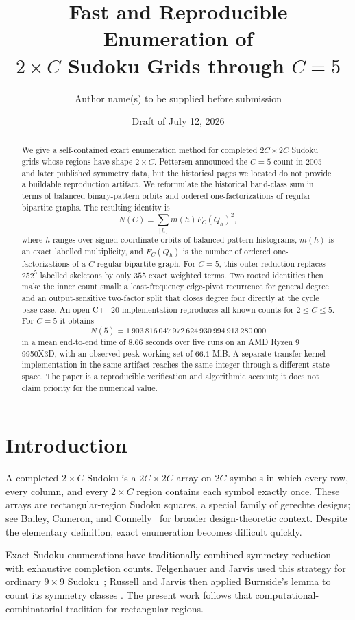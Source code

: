 \documentclass[11pt]{article}
\title{Fast and Reproducible Enumeration of\\
       \texorpdfstring{$2\times C$}{2 by C} Sudoku Grids through
       \texorpdfstring{$C=5$}{C=5}}
\author{Author name(s) to be supplied before submission}
\date{Draft of July 12, 2026}
\theoremstyle{definition}
\theoremstyle{remark}
\newcommand{\Nfive}{1\,903\,816\,047\,972\,624\,930\,994\,913\,280\,000}
\begin{document}
\maketitle

\begin{abstract}
We give a self-contained exact enumeration method for completed
$2C\times2C$ Sudoku grids whose regions have shape $2\times C$.
Pettersen announced the $C=5$ count in 2005 and later published symmetry
data, but the historical pages we located do not provide a buildable
reproduction artifact.  We reformulate the historical band-class sum in
terms of balanced binary-pattern orbits and ordered one-factorizations of
regular bipartite graphs.  The resulting identity is
\[
  N(C)=\sum_{[h]}m(h)F_C(Q_h)^2,
\]
where $h$ ranges over signed-coordinate orbits of balanced pattern
histograms, $m(h)$ is an exact labelled multiplicity, and $F_C(Q_h)$ is the
number of ordered one-factorizations of a $C$-regular bipartite graph.
For $C=5$, this outer reduction replaces $252^5$ labelled skeletons by only
$355$ exact weighted terms.  Two rooted identities then make the inner count
small: a least-frequency edge-pivot recurrence for general degree and an
output-sensitive two-factor split that closes degree four directly at the
cycle base case.
An open C++20 implementation reproduces all known counts for $2\le C\le5$.
For $C=5$ it obtains
\[
  N(5)=\Nfive
\]
in a mean end-to-end time of $8.66$ seconds over five runs on an AMD Ryzen 9
9950X3D, with an observed peak working set of $66.1$ MiB.  A separate
transfer-kernel implementation in the same artifact reaches the same integer
through a different state space.  The paper is a reproducible verification
and algorithmic account; it does not claim priority for the numerical value.
\end{abstract}

\section{Introduction}

A completed $2\times C$ Sudoku is a $2C\times2C$ array on $2C$ symbols in
which every row, every column, and every $2\times C$ region contains each
symbol exactly once.  These arrays are rectangular-region Sudoku squares, a
special family of gerechte designs; see Bailey, Cameron, and
Connelly~\cite{bailey2008gerechte} for broader design-theoretic context.
Despite the elementary definition, exact enumeration becomes difficult
quickly.

Exact Sudoku enumerations have traditionally combined symmetry reduction
with exhaustive completion counts.  Felgenhauer and Jarvis used this strategy
for ordinary $9\times9$ Sudoku~\cite{felgenhauer2006enumerating}; Russell and
Jarvis then applied Burnside's lemma to count its symmetry classes
\cite{russell2006symmetry}.  The present work follows that
computational-combinatorial tradition for rectangular regions.
\end{document}
